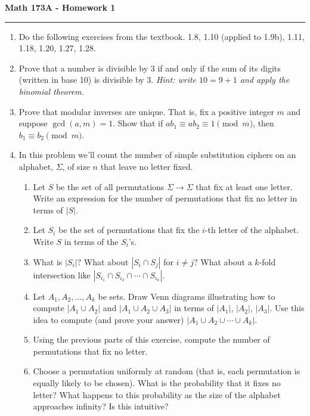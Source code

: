 \documentclass[11pt,letterpaper]{article}
\begin{document}
\begin{center}
{\bf \Large Math 173A - Homework 1}
\vspace{0.2cm}
\hrule
\end{center}

\begin{enumerate}

    \item Do the following exercises from the textbook. 1.8, 1.10 (applied to 1.9b), 1.11, 1.18, 1.20, 1.27, 1.28.

    \item Prove that a number is divisible by 3 if and only if the sum of its digits (written in base 10) is divisible by 3. \emph{Hint: write $10 = 9+1$ and apply the binomial theorem.}

    \item Prove that modular inverses are unique. That is, fix a positive integer $m$ and suppose $\gcd(a,m) = 1$. Show that if $ab_1 \equiv ab_2 \equiv 1\pmod m$, then $b_1 \equiv b_2\pmod m$.

    \item In this problem we'll count the number of simple substitution ciphers on an alphabet, $\Sigma$, of size $n$ that leave no letter fixed.
    \begin{enumerate}
        \item Let $S$ be the set of all permutations $\Sigma\to \Sigma$ that fix at least one letter. Write an expression for the number of permutations that fix no letter in terms of $|S|$.

        \item Let $S_i$ be the set of permutations that fix the $i$-th letter of the alphabet. Write $S$ in terms of the $S_i$'s.

        \item What is $|S_i|$? What about $|S_i \cap S_j|$ for $i\neq j$? What about a $k$-fold intersection like $|S_{i_1}\cap S_{i_2}\cap \cdots \cap S_{i_k}|$.

        \item Let $A_1, A_2, \ldots, A_k$ be sets. Draw Venn diagrams illustrating how to compute $|A_1 \cup A_2|$ and $|A_1 \cup A_2 \cup A_3|$ in terms of  $|A_1|$, $|A_2|$, $|A_3|$. Use this idea to compute (and prove your answer) $|A_1 \cup A_2 \cup \cdots \cup A_k|$.

        \item Using the previous parts of this exercise, compute the number of permutations that fix no letter.

        \item Choose a permutation uniformly at random (that is, each permutation is equally likely to be chosen). What is the probability that it fixes no letter? What happens to this probability as the size of the alphabet approaches infinity? Is this intuitive?
    \end{enumerate}
\end{enumerate}
\end{document}
